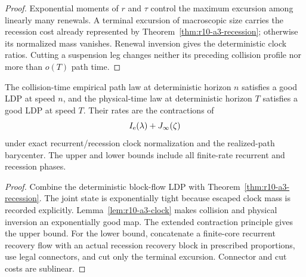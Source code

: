 \begin{proof}
Exponential moments of \(r\) and \(\tau\) control the maximum excursion among
linearly many renewals.  A terminal excursion of macroscopic size carries the
recession cost already represented by
Theorem~\ref{thm:r10-a3-recession}; otherwise its normalized mass vanishes.
Renewal inversion gives the deterministic clock ratios.  Cutting a suspension
leg changes neither its preceding collision profile nor more than \(o(T)\)
path time.
\end{proof}

\begin{theorem}
\label{thm:r10-a3-main}
The collision-time empirical path law at deterministic horizon \(n\) satisfies
a good LDP at speed \(n\), and the physical-time law at deterministic horizon
\(T\) satisfies a good LDP at speed \(T\).  Their rates are the contractions
of
\[
 I_{\rm e}(\lambda)+J_\infty(\zeta)
\]
under exact recurrent/recession clock normalization and the realized-path
barycenter.  The upper and lower bounds include all finite-rate recurrent and
recession phases.
\end{theorem}

\begin{proof}
Combine the deterministic block-flow LDP with
Theorem~\ref{thm:r10-a3-recession}.  The joint state is exponentially tight
because escaped clock mass is recorded explicitly.
Lemma~\ref{lem:r10-a3-clock} makes collision and physical inversion an
exponentially good map.  The extended contraction principle gives the upper
bound.  For the lower bound, concatenate a finite-core recurrent recovery
flow with an actual recession recovery block in prescribed proportions, use
legal connectors, and cut only the terminal excursion.  Connector and cut
costs are sublinear.
\end{proof}
